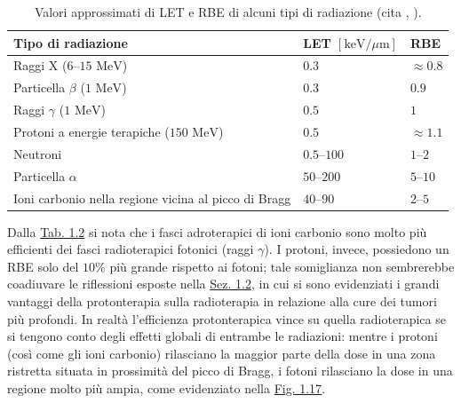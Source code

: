 \documentclass[12pt,a4paper,twoside]{report}
\begin{document}
	\begin{table}[H]
		\centering
		\begin{tabular}{ |m{10cm}||M{3cm}|M{1cm}| }
			\hline
			Tipo di radiazione & LET $\left[\mbox{keV/}\mu\mbox{m}\right]$ & RBE\\
			\hline\hline
			Raggi X ($6$--$15 \mbox{ MeV}$) & $0.3$ &	$\approx 0.8$\\
			\hline
			Particella $\beta$ ($1 \mbox{ MeV}$) & $0.3$ & $0.9$\\
			\hline
			Raggi $\gamma$ ($1 \mbox{ MeV}$) & $0.5$ & $1$\\
			\hline
			Protoni a energie terapiche ($150 \mbox{ MeV}$) & $0.5$ & $\approx1.1$\\
			\hline
			Neutroni & $0.5$--$100$ & $1$--$2$\\
			\hline
			Particella $\alpha$ & $50$--$200$ & $5$--$10$\\
			\hline
			Ioni carbonio nella regione vicina al picco di Bragg & $40$--$90$ & $2$--$5$\\
			\hline
		\end{tabular}
		\caption{Valori approssimati di LET e RBE di alcuni tipi di radiazione (cita
			,
			).}
		\label{tab:let_rbe}
	\end{table}
	
	Dalla \hyperref[tab:let_rbe]{Tab. 1.2} si nota che i fasci adroterapici di ioni carbonio sono molto più efficienti dei fasci radioterapici fotonici (raggi $\gamma$). I protoni, invece, possiedono un RBE solo del $10\%$ più grande rispetto ai fotoni; tale somiglianza non sembrerebbe coadiuvare le riflessioni esposte nella \hyperref[sec:1.2]{Sez. 1.2}, in cui si sono evidenziati i grandi vantaggi della protonterapia sulla radioterapia in relazione alla cure dei tumori più profondi. In realtà l'efficienza protonterapica vince su quella radioterapica se si tengono conto degli effetti globali di entrambe le radiazioni: mentre i protoni (così come gli ioni carbonio) rilasciano la maggior parte della dose in una zona ristretta situata in prossimità del picco di Bragg, i fotoni rilasciano la dose in una regione molto più ampia, come evidenziato nella \hyperref[fig:photon]{Fig. 1.17}.
	
\end{document}
